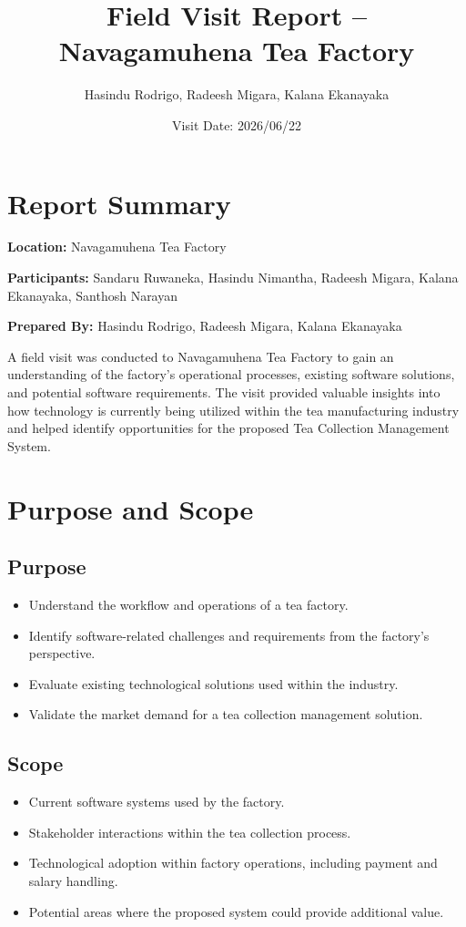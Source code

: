 \documentclass[11pt,a4paper]{article}
\title{\textbf{Field Visit Report -- Navagamuhena Tea Factory}}
\author{Hasindu Rodrigo, Radeesh Migara, Kalana Ekanayaka}
\date{Visit Date: 2026/06/22}
\begin{document}
\maketitle

\section*{Report Summary}

\textbf{Location:} Navagamuhena Tea Factory

\textbf{Participants:} Sandaru Ruwaneka, Hasindu Nimantha, Radeesh Migara, Kalana Ekanayaka, Santhosh Narayan

\textbf{Prepared By:} Hasindu Rodrigo, Radeesh Migara, Kalana Ekanayaka

A field visit was conducted to Navagamuhena Tea Factory to gain an understanding of the factory's operational processes, existing software solutions, and potential software requirements. The visit provided valuable insights into how technology is currently being utilized within the tea manufacturing industry and helped identify opportunities for the proposed Tea Collection Management System.

\section*{Purpose and Scope}

\subsection*{Purpose}
\begin{itemize}[nosep]
    \item Understand the workflow and operations of a tea factory.
    \item Identify software-related challenges and requirements from the factory's perspective.
    \item Evaluate existing technological solutions used within the industry.
    \item Validate the market demand for a tea collection management solution.
\end{itemize}

\subsection*{Scope}
\begin{itemize}[nosep]
    \item Current software systems used by the factory.
    \item Stakeholder interactions within the tea collection process.
    \item Technological adoption within factory operations, including payment and salary handling.
    \item Potential areas where the proposed system could provide additional value.
\end{itemize}
\end{document}
